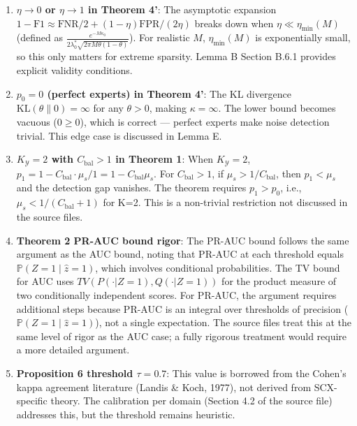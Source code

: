 \documentclass[
  12pt,
]{ctexart}
\begin{document}
\begin{enumerate}
\def\labelenumi{\arabic{enumi}.}
\item
  \textbf{\(\eta \to 0\) or \(\eta \to 1\) in Theorem 4'}: The
  asymptotic expansion
  \(1-\text{F1} \approx \text{FNR}/2 + (1-\eta)\text{FPR}/(2\eta)\)
  breaks down when \(\eta \ll \eta_{\min}(M)\) (defined as
  \(\frac{e^{-M\kappa_0}}{2\lambda_0^*\sqrt{2\pi M\theta(1-\theta)}}\)).
  For realistic \(M\), \(\eta_{\min}(M)\) is exponentially small, so
  this only matters for extreme sparsity. Lemma B Section B.6.1 provides
  explicit validity conditions.
\item
  \textbf{\(p_0 = 0\) (perfect experts) in Theorem 4'}: The KL
  divergence \(\text{KL}(\theta\|0) = \infty\) for any \(\theta>0\),
  making \(\kappa = \infty\). The lower bound becomes vacuous
  (\(0 \geq 0\)), which is correct --- perfect experts make noise
  detection trivial. This edge case is discussed in Lemma E.
\item
  \textbf{\(K_{\mathcal{Y}} = 2\) with \(C_{\text{bal}} > 1\) in Theorem
  1}: When \(K_{\mathcal{Y}} = 2\),
  \(p_1 = 1 - C_{\text{bal}} \cdot \mu_s/1 = 1 - C_{\text{bal}}\mu_s\).
  For \(C_{\text{bal}} > 1\), if \(\mu_s > 1/C_{\text{bal}}\), then
  \(p_1 < \mu_s\) and the detection gap vanishes. The theorem requires
  \(p_1 > p_0\), i.e., \(\mu_s < 1/(C_{\text{bal}}+1)\) for K=2. This is
  a non-trivial restriction not discussed in the source files.
\item
  \textbf{Theorem 2 PR-AUC bound rigor}: The PR-AUC bound follows the
  same argument as the AUC bound, noting that PR-AUC at each threshold
  equals \(\mathbb{P}(Z=1 \mid \hat{z}=1)\), which involves conditional
  probabilities. The TV bound for AUC uses
  \(TV(P(\cdot|Z=1), Q(\cdot|Z=1))\) for the product measure of two
  conditionally independent scores. For PR-AUC, the argument requires
  additional steps because PR-AUC is an integral over thresholds of
  precision (\(\mathbb{P}(Z=1 \mid \hat{z}=1)\)), not a single
  expectation. The source files treat this at the same level of rigor as
  the AUC case; a fully rigorous treatment would require a more detailed
  argument.
\item
  \textbf{Proposition 6 threshold \(\tau = 0.7\)}: This value is
  borrowed from the Cohen's kappa agreement literature (Landis \& Koch,
  1977), not derived from SCX-specific theory. The calibration per
  domain (Section 4.2 of the source file) addresses this, but the
  threshold remains heuristic.
\end{enumerate}
\end{document}
